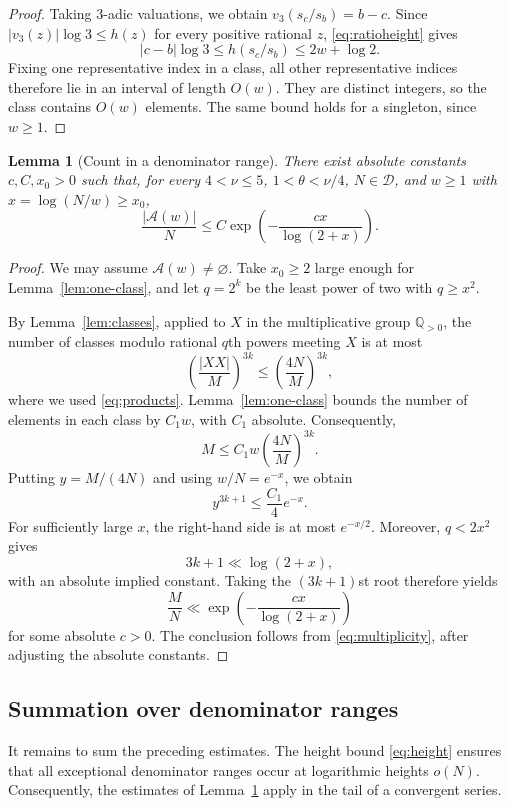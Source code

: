 \documentclass[11pt,reqno]{amsart}
\newtheorem{lemma}{Lemma}[section]
\theoremstyle{definition}
\newcommand{\Q}{\mathbb Q}
\newcommand{\DD}{\mathcal D}
\begin{document}
\begin{proof}
Taking $3$-adic valuations, we obtain
$v_3(s_c/s_b)=b-c$. Since
$|v_3(z)|\log3\le h(z)$ for every positive
rational $z$, \eqref{eq:ratioheight} gives
\[
 |c-b|\log3\le h(s_c/s_b)
 \le2w+\log2.
\]
Fixing one representative index in a class,
all other representative indices therefore
lie in an interval of length $O(w)$.
They are distinct integers, so the class
contains $O(w)$ elements. The same bound
holds for a singleton, since $w\ge1$.
\end{proof}

\begin{lemma}[Count in a denominator range]
\label{lem:block}
There exist absolute constants $c,C,x_0>0$ such
that, for every $4<\nu\le5$, $1<\theta<\nu/4$,
$N\in\DD$, and $w\ge1$ with
$x=\log(N/w)\ge x_0$,
\[
 \frac{|\mathcal A(w)|}{N}
 \le C\exp\left(-\frac{cx}{\log(2+x)}\right).
\]
\end{lemma}

\begin{proof}
We may assume $\mathcal A(w)\ne\varnothing$.
Take $x_0\ge2$ large enough for
Lemma~\ref{lem:one-class}, and let $q=2^k$
be the least power of two with $q\ge x^2$.

By Lemma~\ref{lem:classes}, applied to $X$
in the multiplicative group $\Q_{>0}$, the
number of classes modulo rational $q$th
powers meeting $X$ is at most
\[
 \left(\frac{|XX|}{M}\right)^{3k}
 \le\left(\frac{4N}{M}\right)^{3k},
\]
where we used \eqref{eq:products}.
Lemma~\ref{lem:one-class} bounds the number
of elements in each class by $C_1w$, with
$C_1$ absolute. Consequently,
\[
 M\le C_1w\left(\frac{4N}{M}\right)^{3k}.
\]
Putting $y=M/(4N)$ and using $w/N=e^{-x}$,
we obtain
\[
 y^{3k+1}\le\frac{C_1}{4}e^{-x}.
\]
For sufficiently large $x$, the right-hand
side is at most $e^{-x/2}$. Moreover,
$q<2x^2$ gives
\[
 3k+1\ll\log(2+x),
\]
with an absolute implied constant. Taking
the $(3k+1)$st root therefore yields
\[
 \frac{M}{N}
 \ll\exp\left(-\frac{cx}{\log(2+x)}\right)
\]
for some absolute $c>0$. The conclusion
follows from \eqref{eq:multiplicity}, after
adjusting the absolute constants.
\end{proof}

\subsection{Summation over denominator ranges}

It remains to sum the preceding estimates.
The height bound \eqref{eq:height} ensures
that all exceptional denominator ranges
occur at logarithmic heights $o(N)$.
Consequently, the estimates of
Lemma~\ref{lem:block} apply in the tail
of a convergent series.
\end{document}
